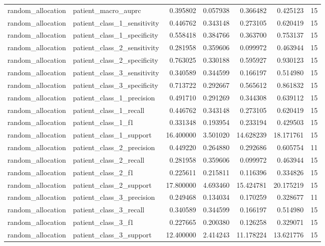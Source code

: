 \begin{tabular}{llrrrrr}
random_allocation & patient_macro_auprc & 0.395802 & 0.057938 & 0.366482 & 0.425123 & 15 \\
random_allocation & patient_class_1_sensitivity & 0.446762 & 0.343148 & 0.273105 & 0.620419 & 15 \\
random_allocation & patient_class_1_specificity & 0.558418 & 0.384766 & 0.363700 & 0.753137 & 15 \\
random_allocation & patient_class_2_sensitivity & 0.281958 & 0.359606 & 0.099972 & 0.463944 & 15 \\
random_allocation & patient_class_2_specificity & 0.763025 & 0.330188 & 0.595927 & 0.930123 & 15 \\
random_allocation & patient_class_3_sensitivity & 0.340589 & 0.344599 & 0.166197 & 0.514980 & 15 \\
random_allocation & patient_class_3_specificity & 0.713722 & 0.292667 & 0.565612 & 0.861832 & 15 \\
random_allocation & patient_class_1_precision & 0.491710 & 0.291269 & 0.344308 & 0.639112 & 15 \\
random_allocation & patient_class_1_recall & 0.446762 & 0.343148 & 0.273105 & 0.620419 & 15 \\
random_allocation & patient_class_1_f1 & 0.331348 & 0.193954 & 0.233194 & 0.429503 & 15 \\
random_allocation & patient_class_1_support & 16.400000 & 3.501020 & 14.628239 & 18.171761 & 15 \\
random_allocation & patient_class_2_precision & 0.449220 & 0.264880 & 0.292686 & 0.605754 & 11 \\
random_allocation & patient_class_2_recall & 0.281958 & 0.359606 & 0.099972 & 0.463944 & 15 \\
random_allocation & patient_class_2_f1 & 0.225611 & 0.215811 & 0.116396 & 0.334826 & 15 \\
random_allocation & patient_class_2_support & 17.800000 & 4.693460 & 15.424781 & 20.175219 & 15 \\
random_allocation & patient_class_3_precision & 0.249468 & 0.134034 & 0.170259 & 0.328677 & 11 \\
random_allocation & patient_class_3_recall & 0.340589 & 0.344599 & 0.166197 & 0.514980 & 15 \\
random_allocation & patient_class_3_f1 & 0.227665 & 0.200380 & 0.126258 & 0.329071 & 15 \\
random_allocation & patient_class_3_support & 12.400000 & 2.414243 & 11.178224 & 13.621776 & 15 \\

\end{tabular}
